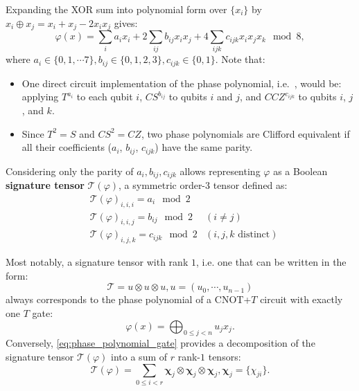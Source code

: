 \documentclass[a4paper,onecolumn,11pt,unpublished]{quantumarticle}
\begin{document}
Expanding the XOR sum into polynomial form over $\{x_i\}$ by $x_i\oplus x_j = x_i + x_j - 2x_ix_j$ gives:
\begin{equation}
\label{eq:phase_polynomial}
  \varphi(x) = \sum_i a_i x_i + 2 \sum_{ij} b_{ij}x_ix_j + 4\sum_{ijk} c_{ijk}x_ix_jx_k \mod 8,
\end{equation}
where $a_i \in \{0, 1, \cdots 7\}, b_{ij}\in \{0, 1, 2, 3\}, c_{ijk}\in \{0, 1\}$.
Note that:
\begin{itemize}
  \item One direct circuit implementation of the phase polynomial, i.e.~, would be: applying $T^{a_i}$ to each qubit $i$, $CS^{b_{ij}}$ to qubits $i$ and $j$, and $CCZ^{c_{ijk}}$ to qubits $i$, $j$, and $k$.
  \item Since $T^2=S$ and $CS^2=CZ$, two phase polynomials are Clifford equivalent if all their coefficients ($a_i$, $b_{ij}$, $c_{ijk}$) have the same parity.
\end{itemize}

Considering only the parity of $a_i, b_{ij}, c_{ijk}$ allows representing $\varphi$ as a Boolean \textbf{signature tensor} $\mathcal{T}(\varphi)$, a symmetric order-3 tensor defined as:
\begin{align}
  &\mathcal{T}(\varphi)_{i, i, i} = a_i\mod 2 &\\
  &\mathcal{T}(\varphi)_{i, i, j} = b_{ij}\mod 2 &(i\neq j)\\
  &\mathcal{T}(\varphi)_{i, j, k} = c_{ijk}\mod 2 &(i, j, k \text{ distinct})
\end{align}

Most notably, a signature tensor with rank $1$, i.e. one that can be written in the form:
\begin{equation}
    \mathcal{T} = u \otimes u \otimes u, u = (u_{0}, \cdots, u_{{n-1}})
\end{equation}
always corresponds to the phase polynomial of a CNOT+$T$ circuit with exactly one $T$ gate:
\begin{equation}
    \varphi(x) = \bigoplus_{0\leq j < n} u_jx_j.
\end{equation}
Conversely, \eqref{eq:phase_polynomial_gate} provides a decomposition of the signature tensor $\mathcal{T}(\mathcal{\varphi})$ into a sum of $r$ rank-$1$ tensors:
\begin{equation}
\label{eq:waring_decomp}
    \mathcal{T}(\varphi) = \sum_{0\leq i<r} \boldsymbol{\chi}_j\otimes \boldsymbol{\chi}_j\otimes \boldsymbol{\chi}_j, \boldsymbol{\chi}_j = \{\chi_{ji}\}.
\end{equation}
\end{document}
